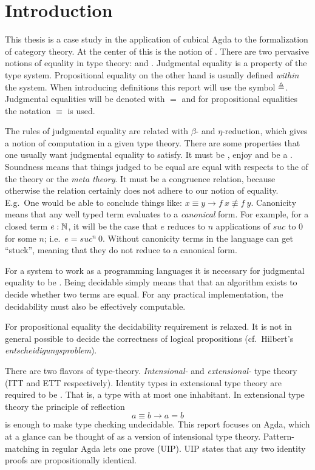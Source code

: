\chapter{Introduction}
This thesis is a case study in the application of cubical Agda to the
formalization of category theory. At the center of this is the notion
of . There are two pervasive notions of equality
in type theory:  and
. Judgmental equality is a property
of the type system.  Propositional equality on the other hand is
usually defined \emph{within} the system.  When introducing
definitions this report will use the symbol $\mathrel{\triangleq}$.  Judgmental
equalities will be denoted with $=$ and for propositional equalities
the notation $\equiv$ is used.

The rules of judgmental equality are related with $β$- and
$η$-reduction, which gives a notion of computation in a given type
theory.
%
There are some properties that one usually want judgmental equality to
satisfy. It must be , enjoy 
and be a . Soundness means that things
judged to be equal are equal with respects to the 
of the theory or the \emph{meta theory}. It must be a congruence
relation, because otherwise the relation certainly does not adhere to
our notion of equality. E.g.\ One would be able to conclude things
like: $x \equiv y \rightarrow f\ x \nequiv f\ y$. Canonicity means
that any well typed term evaluates to a \emph{canonical} form. For
example, for a closed term $e \mathrel{:} \mathbb{N}$, it will be the case that $e$
reduces to $n$ applications of $\mathit{suc}$ to $0$ for some $n$;
i.e.\ $e = \mathit{suc}^n\ 0$.  Without canonicity terms in the
language can get ``stuck'', meaning that they do not reduce to a
canonical form.

For a system to work as a programming languages it is necessary for
judgmental equality to be . Being decidable
simply means that that an algorithm exists to decide whether two terms
are equal.  For any practical implementation, the decidability must
also be effectively computable.

For propositional equality the decidability requirement is relaxed. It
is not in general possible to decide the correctness of logical
propositions (cf.\ Hilbert's \emph{entscheidigungsproblem}).

There are two flavors of type-theory. \emph{Intensional-} and
\emph{extensional-} type theory (ITT and ETT respectively). Identity
types in extensional type theory are required to be
. That is, a type with at most one
inhabitant. In extensional type theory the principle of reflection
%
$$a ≡ b → a = b$$
%
is enough to make type checking undecidable. This report focuses on
Agda, which at a glance can be thought of as a version of intensional
type theory. Pattern-matching in regular Agda lets one prove
 (UIP). UIP states that any
two identity proofs are propositionally identical.

